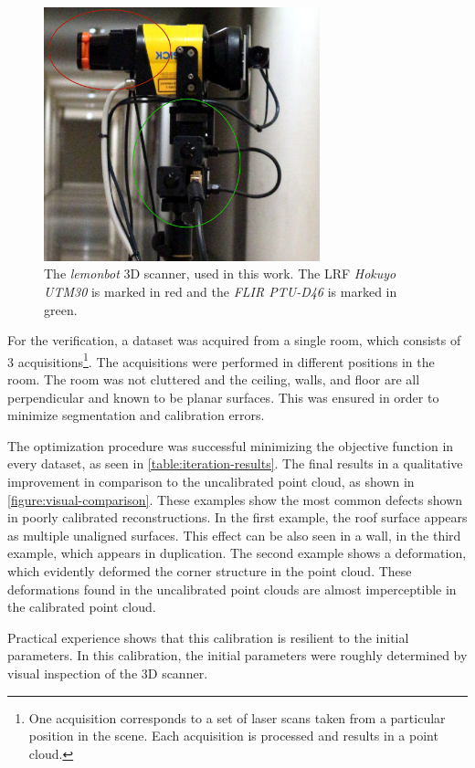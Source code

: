 \documentclass[conference]{IEEEtran}
\begin{document}
\begin{figure}[h]
    \centering
    \includegraphics[width=8cm]{images/lemonbot-head}
    \caption{The \textit{lemonbot} 3D scanner, used in this work. The LRF \textit{Hokuyo UTM30} is marked in red and the \textit{FLIR PTU-D46} is marked in green.}
    \label{figure:lemonbot}
\end{figure}

For the verification, a dataset was acquired from a single room, which consists of 3 acquisitions\footnote{One acquisition corresponds to a set of laser scans taken from a particular position in the scene. Each acquisition is processed and results in a point cloud.}. The acquisitions were performed in different positions in the room. The room was not cluttered and the ceiling, walls, and floor are all perpendicular and known to be planar surfaces. This was ensured in order to minimize segmentation and calibration errors.

The optimization procedure was successful minimizing the objective function in every dataset, as seen in \cref{table:iteration-results}. The final results in a qualitative improvement in comparison to the uncalibrated point cloud, as shown in \cref{figure:visual-comparison}. These examples show the most common defects shown in poorly calibrated reconstructions. In the first example, the roof surface appears as multiple unaligned surfaces. This effect can be also seen in a wall, in the third example, which appears in duplication. The second example shows a deformation, which evidently deformed the corner structure in the point cloud. These deformations found in the uncalibrated point clouds are almost imperceptible in the calibrated point cloud.

Practical experience shows that this calibration is resilient to the initial parameters. In this calibration, the initial parameters were roughly determined by visual inspection of the 3D scanner. 
\end{document}
